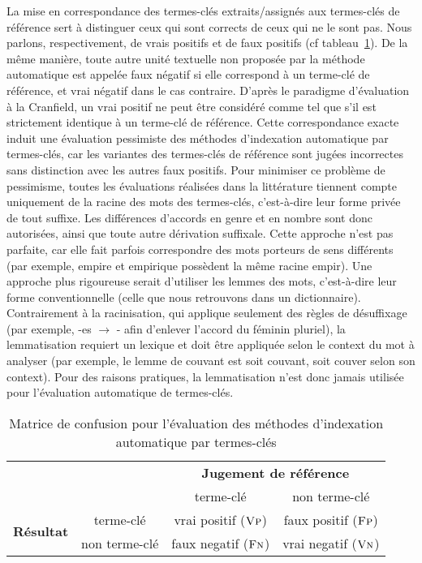     La mise en correspondance des termes-clés extraits/assignés aux termes-clés
    de référence sert à distinguer ceux qui sont corrects de ceux qui ne le sont
    pas. Nous parlons, respectivement, de vrais positifs et de faux positifs (cf
    tableau~\ref{tab:confusion_matrix}). De la même manière, toute autre unité
    textuelle non proposée par la méthode automatique est appelée faux négatif
    si elle correspond à un terme-clé de référence, et vrai négatif dans le cas
    contraire. D'après le paradigme d'évaluation \og{}à la Cranfield\fg{}, un
    vrai positif ne peut être considéré comme tel que s'il est strictement
    identique à un terme-clé de référence. Cette correspondance \og{}exacte\fg{}
    induit une évaluation pessimiste des méthodes d'indexation automatique par
    termes-clés, car les variantes des termes-clés de référence sont jugées
    incorrectes sans distinction avec les autres faux positifs. Pour minimiser
    ce problème de pessimisme, toutes les évaluations réalisées dans la
    littérature tiennent compte uniquement de la racine des mots des
    termes-clés, c'est-à-dire leur forme privée de tout suffixe. Les différences
    d'accords en genre et en nombre sont donc autorisées, ainsi que toute autre
    dérivation suffixale. Cette approche n'est pas parfaite, car elle fait
    parfois correspondre des mots porteurs de sens différents (par exemple,
    \og{}empire\fg{} et \og{}empirique\fg{} possèdent la même racine
    \og{}empir\fg{}). Une approche plus rigoureuse serait d'utiliser les lemmes
    des mots, c'est-à-dire leur forme conventionnelle (celle que nous retrouvons
    dans  un dictionnaire). Contrairement à la racinisation, qui applique
    seulement des règles de désuffixage (par exemple, -es $\rightarrow$ - afin
    d'enlever l'accord du féminin pluriel), la lemmatisation requiert un lexique
    et doit être appliquée selon le context du mot à analyser (par exemple, le
    lemme de \og{}couvant\fg{} est soit \og{}couvant\fg{}, soit \og{}couver\fg{}
    selon son context). Pour des raisons pratiques, la lemmatisation n'est donc
    jamais utilisée pour l'évaluation automatique de termes-clés.
    \begin{table}
      \begin{center}
        \begin{tabular}{cc|cc}
          \toprule
          \multicolumn{2}{c|}{} & \multicolumn{2}{c}{\textbf{Jugement de référence}}\\
          \multicolumn{2}{c|}{} & \og{}terme-clé\fg{} & \og{}non terme-clé\fg{}\\
          \hline
          \multirow{2}{*}{\textbf{Résultat}} & \og{}terme-clé\fg{} & vrai positif ($\textsc{Vp}$) & faux positif ($\textsc{Fp}$)\\
          & \og{}non terme-clé\fg{} & faux negatif ($\textsc{Fn}$) & vrai negatif ($\textsc{Vn}$)\\
          \bottomrule
        \end{tabular}
        \caption{Matrice de confusion pour l'évaluation des méthodes
                 d'indexation automatique par termes-clés
                \label{tab:confusion_matrix}}
      \end{center}
    \end{table}

